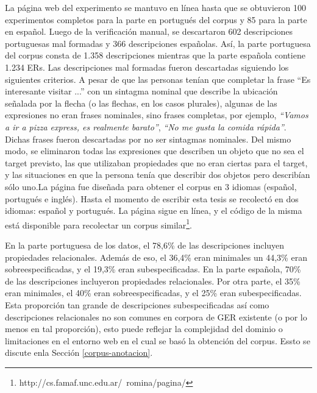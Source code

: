La p\'agina web del experimento se mantuvo en l\'{i}nea hasta que se obtuvieron 100 experimentos completos para la parte en portugu\'es del corpus y 85  para la parte en espa\~nol. Luego de la verificaci\'on manual, se descartaron 602 descripciones portuguesas mal formadas y 366 descripciones espa\~nolas. As\'{i}, la parte portuguesa del corpus consta de 1.358 descripciones mientras que la parte espa\~nola contiene 1.234 ERs. 
Las descripciones mal formadas fueron descartadas siguiendo los siguientes criterios. A pesar de que las personas ten\'{i}an que completar la frase ``Es interesante visitar ...'' con un sintagma nominal que describe la ubicaci\'on se\~nalada por la flecha (o las flechas, en los casos plurales), algunas de las expresiones no eran frases nominales, sino frases completas, por ejemplo, \emph{``Vamos a ir a pizza express, es realmente barato''}, \emph{``No me gusta la comida r\'apida''}. Dichas frases fueron descartadas por no ser sintagmas nominales. Del mismo modo, se eliminaron todas las expresiones que describen un objeto que no sea el target previsto, las que utilizaban propiedades que no eran ciertas para el target, y las situaciones en que la persona ten\'{i}a que describir dos objetos pero describ\'ian s\'olo uno.La p\'agina fue dise\~nada para obtener el corpus en 3 idiomas (espa\~nol, portugu\'es e ingl\'es). Hasta el momento de escribir esta tesis se recolect\'o en dos idiomas: espa\~nol y portugu\'es. La p\'agina sigue en l\'inea, y el c\'odigo de la misma est\'a disponible para recolectar un corpus similar\footnote{http://cs.famaf.unc.edu.ar/~romina/pagina/}.

En la parte portuguesa de los datos, el 78,6\% de las descripciones incluyen propiedades relacionales. Adem\'as de eso, el 36,4\% eran minimales un 44,3\% eran sobreespecificadas, y el 19,3\% eran subespecificadas. En la parte espa\~nola, 70\% de las descripciones incluyeron propiedades relacionales. Por otra parte, el 35\% eran minimales, el 40\% eran sobreespecificadas, y el 25\% eran subespecificadas.
Esta proporci\'on tan grande de descripciones subespecificadas as\'{i} como descripciones relacionales no son comunes en corpora de GER existente (o por lo menos en tal proporci\'on), esto puede reflejar la complejidad del dominio o limitaciones en el entorno web en el cual se bas\'o la obtenci\'on del corpus. Essto se discute enla Secci\'on \ref{corpus-anotacion}.



